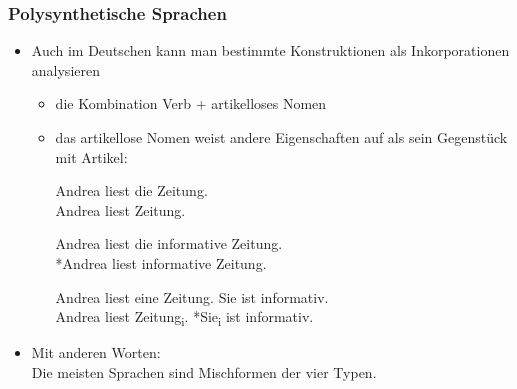 \begin{frame}
\frametitle{Polysynthetische Sprachen}

\begin{itemize}
	\item Auch im Deutschen kann man bestimmte Konstruktionen als Inkorporationen analysieren
	
	\begin{itemize}
		\item die Kombination Verb + artikelloses Nomen
		\item das artikellose Nomen weist andere Eigenschaften auf als sein Gegenstück mit Artikel:
		
		\ea Andrea liest die Zeitung. \\
			 Andrea liest Zeitung.
		\z
			 
		\ea Andrea liest die informative Zeitung. \\
			 *Andrea liest informative Zeitung.
		\z
			 
		\ea Andrea liest eine Zeitung. Sie ist informativ. \\
			 Andrea liest Zeitung\textsubscript{i}. *Sie\textsubscript{i} ist informativ.
		\z
			 
	\end{itemize}
	\item Mit anderen Worten: \\
		Die meisten Sprachen sind Mischformen der vier Typen.
\end{itemize}


\end{frame}



